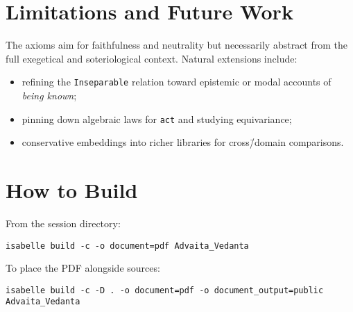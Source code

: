 \documentclass[11pt,a4paper]{article}
\begin{document}
\section{Limitations and Future Work}

The axioms aim for faithfulness and neutrality but necessarily abstract from the
full exegetical and soteriological context. Natural extensions include:
\begin{itemize}
  \item refining the \texttt{Inseparable} relation toward epistemic or modal
        accounts of \emph{being known};
  \item pinning down algebraic laws for \texttt{act} and studying equivariance;
  \item conservative embeddings into richer libraries for cross\=/domain
        comparisons.
\end{itemize}

\section{How to Build}

From the session directory:
\begin{lstlisting}
isabelle build -c -o document=pdf Advaita_Vedanta
\end{lstlisting}
To place the PDF alongside sources:
\begin{lstlisting}
isabelle build -c -D . -o document=pdf -o document_output=public Advaita_Vedanta
\end{lstlisting}

\bigskip



\end{document}
